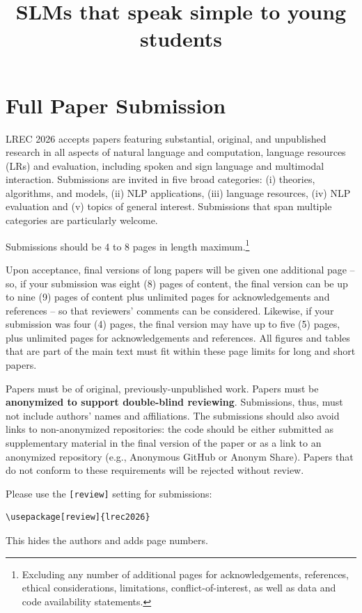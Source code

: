 \documentclass[10pt, a4paper]{article}
\title{SLMs that speak simple to young students}
\begin{document}
\maketitleabstract

\section{Full Paper Submission}

LREC 2026 accepts papers featuring substantial, original, and unpublished research in all aspects of natural language and computation, language resources (LRs) and evaluation, including spoken and sign language and multimodal interaction. Submissions are invited in five broad categories: (i) theories, algorithms, and models, (ii) NLP applications, (iii) language resources, (iv) NLP evaluation and (v) topics of general interest. Submissions that span multiple categories are particularly welcome.   

Submissions should be 4 to 8 pages in length maximum.\footnote{Excluding any number of additional pages for acknowledgements, references, ethical considerations, limitations, conflict-of-interest, as well as data and code availability statements.}

Upon acceptance, final versions of long papers will be given one
additional page – so, if your submission was eight (8) pages of content, the final version can be up to nine (9) pages of content plus unlimited pages for acknowledgements and references – so that reviewers’ comments can be considered. Likewise, if your submission was four (4) pages, the final version may have up to five (5) pages, plus unlimited pages for acknowledgements and references. All figures and tables that are part of the main text must fit within these page limits for long and short papers.

Papers must be of original, previously-unpublished work. Papers must be \textbf{anonymized to support double-blind reviewing}. Submissions, thus, must not include authors’ names and affiliations. The submissions should also avoid links to non-anonymized repositories: the code should be either submitted as supplementary material in the final version of the paper or as a link to an anonymized repository (e.g., Anonymous GitHub or Anonym Share). Papers that do not conform to these requirements will be rejected without review.

Please use the \texttt{[review]} setting for submissions:

\begin{verbatim}
\usepackage[review]{lrec2026}
\end{verbatim}

This hides the authors and adds page numbers.
\end{document}
